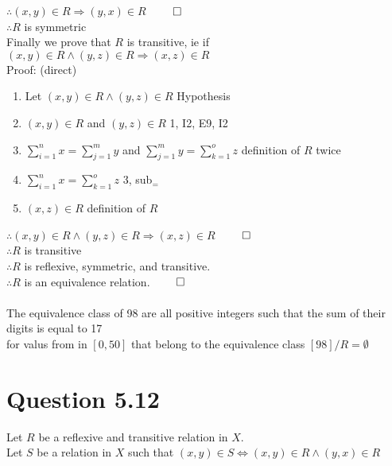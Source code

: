 \documentclass{article}
\begin{document}
		$\therefore (x, y) \in R \Rightarrow (y, x) \in R$ \hfill $\qed$ \\
		$\therefore R$ is symmetric \\
		Finally we prove that $R$ is transitive, ie if $(x, y) \in R \land (y, z) \in R \Rightarrow (x, z) \in R$ \\
		Proof: (direct)
		\begin{enumerate}
			\item Let $(x, y) \in R \land (y, z) \in R$ \hfill Hypothesis
			\item $(x, y) \in R$ and $(y, z) \in R$ \hfill 1, I2, E9, I2
			\item $\sum\limits_{i = 1}^{n} x = \sum\limits_{j = 1}^{m} y$ and $\sum\limits_{j = 1}^{m} y = \sum\limits_{k = 1}^{o} z$ \hfill definition of $R$ twice
			\item $\sum\limits_{i = 1}^{n} x = \sum\limits_{k = 1}^{o} z$ \hfill 3, sub$_{=}$
			\item $(x, z) \in R$ \hfill definition of $R$
		\end{enumerate}
		$\therefore (x, y) \in R \land (y, z) \in R \Rightarrow (x, z) \in R$ \hfill $\qed$ \\
		$\therefore R$ is transitive \\
		$\therefore R$ is reflexive, symmetric, and transitive. \\
		$\therefore R$ is an equivalence relation. \hfill $\qed$ \\
		\\
		The equivalence class of 98 are all positive integers such that the sum of their digits is equal to 17 \\
		for valus from in $[0, 50]$ that belong to the equivalence class $[98]/R = \emptyset$
	\section{Question 5.12}
		Let $R$ be a reflexive and transitive relation in $X$. \\
		Let $S$ be a relation in $X$ such that $(x, y) \in S \Leftrightarrow (x, y) \in R \land (y, x) \in R$ 
\end{document}
